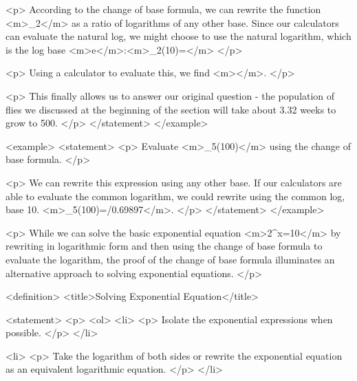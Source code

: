                 <p>
                    According to the change of base formula, we can rewrite the function <m>\log_{2}</m> as a ratio of logarithms of any other base.
                    Since our calculators can evaluate the natural log, we might choose to use the natural logarithm, which is the log base <m>e</m>:<m>\log_{2}(⁡10)=</m>
                </p>

                <p>
                    Using a calculator to evaluate this, we find <m>\approx {}</m>.
                </p>

                <p>
                    This finally allows us to answer our original question - the population of flies we discussed at the beginning of the section will take about 3.32 weeks to grow to 500.
                </p>
            </statement>
        </example>

        <example>
            <statement>
                <p>
                    Evaluate <m>\log_{5}⁡(100)</m> using the change of base formula.
                </p>

                <p>
                    We can rewrite this expression using any other base.
                    If our calculators are able to evaluate the common logarithm, we could rewrite using the common log, base 10.
                    <m>\log_{5}⁡(100)=/0.69897</m>.
                </p>
            </statement>
        </example>

        <p>
            While we can solve the basic exponential equation <m>2^{x}=10</m> by rewriting in logarithmic form and then using the change of base formula to evaluate the logarithm, the proof of the change of base formula illuminates an alternative approach to solving exponential equations.
        </p>

        <definition>
            <title>Solving Exponential Equation</title>

            <statement>
                <p>
                    <ol>
                        <li>
                            <p>
                                Isolate the exponential expressions when possible.
                            </p>
                        </li>

                        <li>
                            <p>
                                Take the logarithm of both sides or rewrite the exponential equation as an equivalent logarithmic equation.
                            </p>
                        </li>

